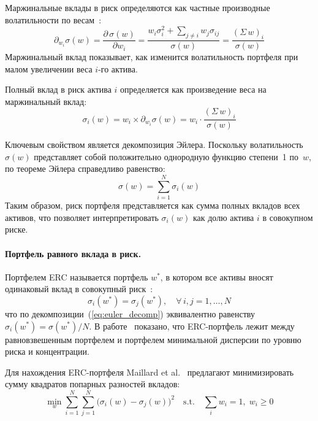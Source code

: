 \documentclass[]{article}
\begin{document}
	Маржинальные вклады в риск определяются как частные производные волатильности по
	весам~\cite{maillard2010}:
	\begin{equation}
		\label{eq:marginal_rc}
		\partial_{w_i} \sigma(w) = \frac{\partial\, \sigma(w)}{\partial w_i}
		= \frac{w_i \sigma_i^2 + \sum_{j \neq i} w_j \sigma_{ij}}{\sigma(w)}
		= \frac{(\Sigma\, w)_i}{\sigma(w)}
	\end{equation}
	Маржинальный вклад показывает, как изменится волатильность портфеля при малом увеличении
	веса $i$-го актива.

	Полный вклад в риск актива $i$ определяется как произведение веса на маржинальный вклад:
	\begin{equation}
		\label{eq:risk_contribution}
		\sigma_i(w) = w_i \times \partial_{w_i} \sigma(w) = w_i \cdot \frac{(\Sigma\, w)_i}{\sigma(w)}
	\end{equation}

	Ключевым свойством является декомпозиция Эйлера. Поскольку волатильность $\sigma(w)$
	представляет собой положительно однородную функцию степени~1 по~$w$, по теореме Эйлера
	справедливо равенство:
	\begin{equation}
		\label{eq:euler_decomp}
		\sigma(w) = \sum_{i=1}^{N} \sigma_i(w)
	\end{equation}
	Таким образом, риск портфеля представляется как сумма полных вкладов всех активов, что
	позволяет интерпретировать $\sigma_i(w)$ как долю актива $i$ в совокупном риске.

	\paragraph{Портфель равного вклада в риск.}
	Портфелем ERC называется портфель $w^{*}$, в котором все активы вносят одинаковый вклад в
	совокупный риск~\cite{maillard2010}:
	\begin{equation}
		\label{eq:erc_condition}
		\sigma_i(w^*) = \sigma_j(w^*), \quad \forall\, i, j = 1, \ldots, N
	\end{equation}
	что по декомпозиции~(\ref{eq:euler_decomp}) эквивалентно равенству $\sigma_i(w^*) = \sigma(w^*) / N$.
	В работе~\cite{maillard2010} показано, что ERC-портфель лежит между равновзвешенным портфелем
	и портфелем минимальной дисперсии по уровню риска и концентрации.

	Для нахождения ERC-портфеля Maillard et al.~\cite{maillard2010} предлагают минимизировать
	сумму квадратов попарных разностей вкладов:
	\begin{equation}
		\label{eq:erc_obj_original}
		\min_w \sum_{i=1}^{N} \sum_{j=1}^{N}
		\bigl(\sigma_i(w) - \sigma_j(w)\bigr)^2
		\quad \text{s.t.} \quad \sum_i w_i = 1, \; w_i \geq 0
	\end{equation}
\end{document}
